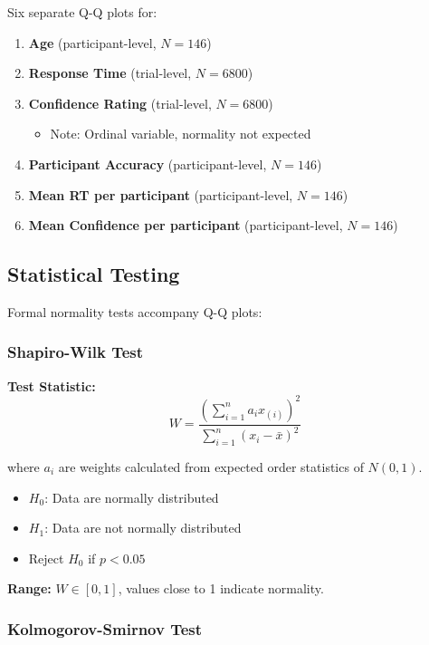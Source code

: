 \documentclass[12pt,a4paper]{article}
\begin{document}
Six separate Q-Q plots for:
\begin{enumerate}
    \item \textbf{Age} (participant-level, $N=146$)
    \item \textbf{Response Time} (trial-level, $N=6800$)
    \item \textbf{Confidence Rating} (trial-level, $N=6800$)
        \begin{itemize}
            \item Note: Ordinal variable, normality not expected
        \end{itemize}
    \item \textbf{Participant Accuracy} (participant-level, $N=146$)
    \item \textbf{Mean RT per participant} (participant-level, $N=146$)
    \item \textbf{Mean Confidence per participant} (participant-level, $N=146$)
\end{enumerate}

\subsection{Statistical Testing}

Formal normality tests accompany Q-Q plots:

\subsubsection{Shapiro-Wilk Test}

\textbf{Test Statistic:}
\begin{equation}
W = \frac{\left(\sum_{i=1}^{n} a_i x_{(i)}\right)^2}{\sum_{i=1}^{n} (x_i - \bar{x})^2}
\end{equation}

where $a_i$ are weights calculated from expected order statistics of $N(0,1)$.

\begin{itemize}
    \item $H_0$: Data are normally distributed
    \item $H_1$: Data are not normally distributed
    \item Reject $H_0$ if $p < 0.05$
\end{itemize}

\textbf{Range:} $W \in [0, 1]$, values close to 1 indicate normality.

\subsubsection{Kolmogorov-Smirnov Test}
\end{document}
